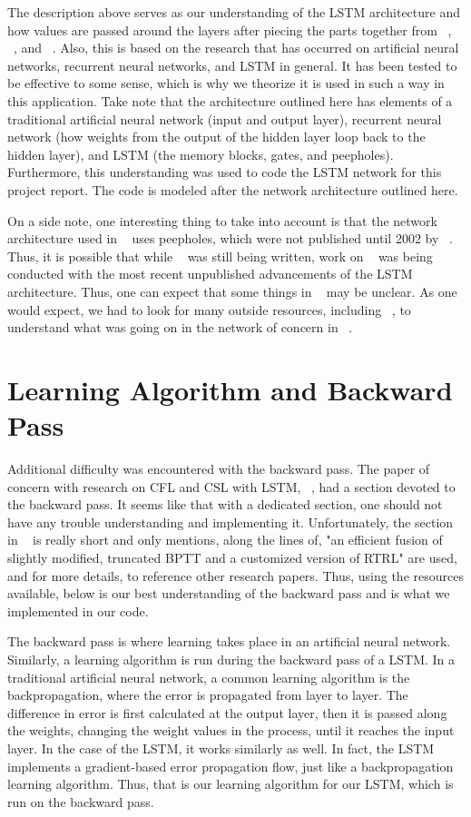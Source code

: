 \documentclass[11pt,letterpaper]{article}
\begin{document}
The description above serves as our understanding of the LSTM architecture and how values are passed around the layers after piecing the parts together from ~\cite{Gers:99}, ~\cite{Gers:01}, and ~\cite{Gers:02}. Also, this is based on the research that has occurred on artificial neural networks, recurrent neural networks, and LSTM in general. It has been tested to be effective to some sense, which is why we theorize it is used in such a way in this application. Take note that the architecture outlined here has elements of a traditional artificial neural network (input and output layer), recurrent neural network (how weights from the output of the hidden layer loop back to the hidden layer), and LSTM (the memory blocks, gates, and peepholes). Furthermore, this understanding was used to code the LSTM network for this project report. The code is modeled after the network architecture outlined here.

On a side note, one interesting thing to take into account is that the network architecture used in ~\cite{Gers:01} uses peepholes, which were not published until 2002 by ~\cite{Gers:02}. Thus, it is possible that while ~\cite{Gers:02} was still being written, work on ~\cite{Gers:01} was being conducted with the most recent unpublished advancements of the LSTM architecture. Thus, one can expect that some things in ~\cite{Gers:01} may be unclear. As one would expect, we had to look for many outside resources, including ~\cite{Gers:02}, to understand what was going on in the network of concern in ~\cite{Gers:01}.

\section{Learning Algorithm and Backward Pass}
Additional difficulty was encountered with the backward pass. The paper of concern with research on CFL and CSL with LSTM, ~\cite{Gers:01}, had a section devoted to the backward pass. It seems like that with a dedicated section, one should not have any trouble understanding and implementing it. Unfortunately, the section in ~\cite{Gers:01} is really short and only mentions, along the lines of, "an efficient fusion of slightly modified, truncated BPTT and a customized version of RTRL" are used, and for more details, to reference other research papers. Thus, using the resources available, below is our best understanding of the backward pass and is what we implemented in our code.

The backward pass is where learning takes place in an artificial neural network. Similarly, a learning algorithm is run during the backward pass of a LSTM. In a traditional artificial neural network, a common learning algorithm is the backpropagation, where the error is propagated from layer to layer. The difference in error is first calculated at the output layer, then it is passed along the weights, changing the weight values in the process, until it reaches the input layer. In the case of the LSTM, it works similarly as well. In fact, the LSTM implements a gradient-based error propagation flow, just like a backpropagation learning algorithm. Thus, that is our learning algorithm for our LSTM, which is run on the backward pass.
\end{document}

